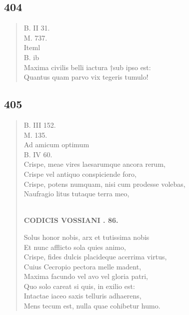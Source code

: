 \documentclass[11pt, a4paper]{report}
\begin{document}
            \subsection*{404}
      \begin{verse}
      B. II 31. \\ M. 737. \\  \lbrack Iteml \\ B. ib \\ Maxima civilis belli iactura †sub ipso est: \\ Quantus quam parvo vix tegeris tumulo! \\ 
      \end{verse}
  
            \subsection*{405}
      \begin{verse}
      B. III 152. \\ M. 135. \\ Ad amicum optimum \\ B. IV 60. \\ Crispe, meae vires laesarumque ancora rerum, \\ Crispe vel antiquo conspiciende foro, \\ Crispe, potens numquam, nisi cum prodesse volebas, \\ Naufragio litus tutaque terra meo, \\ 
        ﻿\pagebreak 
    \begin{center} \textbf{CODICIS VOSSIANI . 86.} \end{center} \marginpar{[315]} Solus honor nobis, arx et tutissima nobis \\ Et nunc afflicto sola quies animo, \\ Crispe, fides dulcis placideque acerrima virtus, \\ Cuius Cecropio pectora melle madent, \\ Maxima facundo vel avo vel gloria patri, \\ Quo solo careat si quis, in exilio est: \\ Intactae iaceo saxis telluris adhaerens, \\ Mens tecum est, nulla quae cohibetur humo. \\ 
      \end{verse}
  
\end{document}
